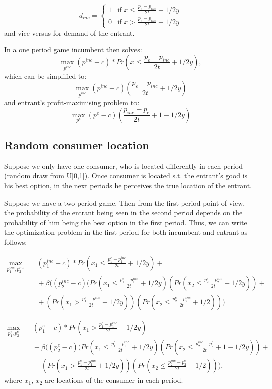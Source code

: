 \documentclass{article}
\begin{document}
$$d_{inc} = \begin{cases}
    1 &  \text{if } x \leq \frac{p_{e}-p_{inc}}{2t} + 1/2y\\
    0 &  \text{if } x > \frac{p_{e}-p_{inc}}{2t} + 1/2y
    \end{cases}
$$
 and vice versus for demand of the entrant.
 
In a one period game incumbent then solves:
$$\max_{p^{inc}} (p^{inc}-c)* Pr(x \leq \frac{p_{e}-p_{inc}}{2t} + 1/2y),$$
which can be simplified to:
$$\max_{p^{inc}} (p^{inc}-c)(\frac{p_{e}-p_{inc}}{2t} + 1/2y)$$
and entrant's profit-maximising problem to:
$$\max_{p^{e}} (p^{e}-c)(\frac{p_{inc}-p_{e}}{2t} + 1 - 1/2y)$$

\subsection{Random consumer location}
    
    Suppose we only have one consumer, who is located differently in each period (random draw from U[0,1]). Once consumer is located s.t. the entrant's good is his best option, in the next periods he perceives the true location of the entrant.
    
    Suppose we have a two-period game. Then from the first period point of view, the probability of the entrant being seen in the second period depends on the probability of him being the best option in the first period. Thus, we can write the optimization problem in the first period for both incumbent and entrant as follows:
    
    $$ \begin{aligned}
    \max_{p^{inc}_1, p^{inc}_2} {}
    & \quad (p^{inc}_1-c)* Pr(x_1 \leq \frac{p^{e}_1-p^{inc}_1}{2t} + 1/2y) + \\
    & \quad + \beta((p^{inc}_2-c)(Pr(x_1 \leq \frac{p^{e}_1-p^{inc}_1}{2t} + 1/2y)(Pr(x_2 \leq \frac{p^{e}_2-p^{inc}_2}{2t} + 1/2y)) + \\
    & \quad + (Pr(x_1 > \frac{p^{e}_1-p^{inc}_1}{2t} + 1/2y))(Pr(x_2 \leq \frac{p^{e}_2-p^{inc}_2}{2t} + 1/2)))
    \end{aligned}
    $$

    $$ \begin{aligned}
    \max_{p^{e}_1, p^{e}_2} {}
    & \quad (p^{e}_1-c)* Pr(x_1 > \frac{p^{e}_1-p^{inc}_1}{2t} + 1/2y) + \\
    & \quad + \beta((p^{e}_2-c)(Pr(x_1 \leq \frac{p^{e}_1-p^{inc}_1}{2t} + 1/2y)(Pr(x_2 \leq \frac{p^{inc}_2-p^{e}_2}{2t} + 1 - 1/2y)) + \\
    & \quad + (Pr(x_1 > \frac{p^{e}_1-p^{inc}_1}{2t} + 1/2y))(Pr(x_2 \leq \frac{p^{inc}_2-p^{e}_2}{2t} + 1/2))),
    \end{aligned}
    $$
where $x_1$, $x_2$ are locations of the consumer in each period. 
\end{document}
